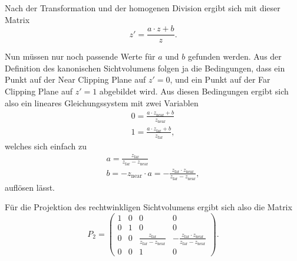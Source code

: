Nach der Transformation und der homogenen Division ergibt sich mit dieser Matrix
\begin{equation}
 z' = \frac{a \cdot z + b}{z}.
\end{equation}

Nun müssen nur noch passende Werte für $a$ und $b$ gefunden werden. Aus der Definition des kanonischen Sichtvolumens folgen ja die Bedingungen, dass ein Punkt auf der Near Clipping Plane auf $z'=0$, und ein Punkt auf der Far Clipping Plane auf $z'=1$ abgebildet wird. Aus diesen Bedingungen ergibt sich also ein lineares Gleichungssystem mit zwei Variablen
\begin{equation}
\begin{split}
 0 = \frac{a \cdot z_\mathrm{near} + b}{z_\mathrm{near}} \\
 1 = \frac{a \cdot z_\mathrm{far} + b}{z_\mathrm{far}},
\end{split}
\end{equation}
welches sich einfach zu
\begin{equation}
\begin{split}
 a = \frac{z_\mathrm{far}}{z_\mathrm{far}-z_\mathrm{near}} \\
 b = -z_\mathrm{near} \cdot a = -\frac{z_\mathrm{far} \cdot z_\mathrm{near}}{z_\mathrm{far}-z_\mathrm{near}},
\end{split}
\end{equation}
auflösen lässt. 

Für die Projektion des rechtwinkligen Sichtvolumens ergibt sich also die Matrix
\begin{equation}
 P_2 = \begin{pmatrix}
  1 & 0 & 0 & 0 \\
  0 & 1 & 0 & 0 \\
  0 & 0 & \frac{z_\mathrm{far}}{z_\mathrm{far}-z_\mathrm{near}} & -\frac{z_\mathrm{far} \cdot z_\mathrm{near}}{z_\mathrm{far}-z_\mathrm{near}} \\
  0 & 0 & 1 & 0
 \end{pmatrix}.
\end{equation}

